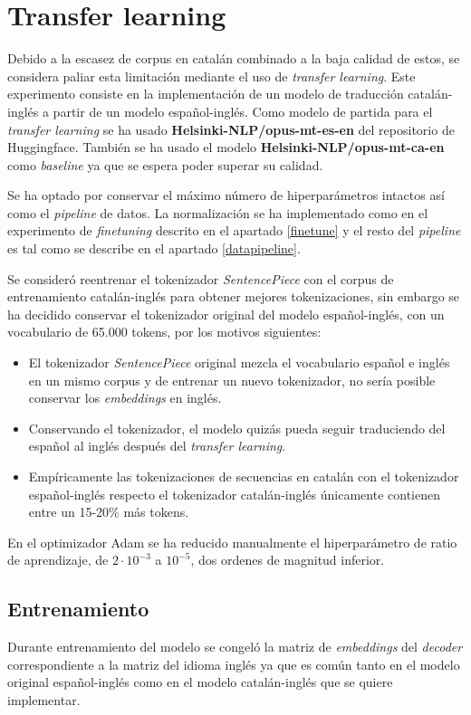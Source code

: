\section{Transfer learning}
Debido a la escasez de corpus en catalán combinado a la baja calidad de estos, se considera paliar esta limitación mediante el uso de \textit{transfer learning}.
Este experimento consiste en la implementación de un modelo de traducción catalán-inglés a partir de un modelo español-inglés.
Como modelo de partida para el \textit{transfer learning} se ha usado \textbf{Helsinki-NLP/opus-mt-es-en} del repositorio de Huggingface. También se ha usado el modelo \textbf{Helsinki-NLP/opus-mt-ca-en} como \textit{baseline} ya que se espera poder superar su calidad.

Se ha optado por conservar el máximo número de hiperparámetros intactos así como el \textit{pipeline} de datos. La normalización se ha implementado como en el experimento de \textit{finetuning} descrito en el apartado \ref{finetune} y el resto del \textit{pipeline} es tal como se describe en el apartado \ref{datapipeline}.

Se consideró reentrenar el tokenizador \textit{SentencePiece} con el corpus de entrenamiento catalán-inglés para obtener mejores tokenizaciones, sin embargo se ha decidido conservar el tokenizador original del modelo español-inglés, con un vocabulario de 65.000 tokens, por los motivos siguientes:
\begin{itemize}
    \item El tokenizador \textit{SentencePiece} original mezcla el vocabulario español e inglés en un mismo corpus y de entrenar un nuevo tokenizador, no sería posible conservar los \textit{embeddings} en inglés.
    \item Conservando el tokenizador, el modelo quizás pueda seguir traduciendo del español al inglés después del \textit{transfer learning}.
    \item Empíricamente las tokenizaciones de secuencias en catalán con el tokenizador español-inglés respecto el tokenizador catalán-inglés únicamente contienen entre un 15-20\% más tokens.
\end{itemize}

En el optimizador Adam \cite{Kingma2014Dec} se ha reducido manualmente el hiperparámetro de ratio de aprendizaje, de $2\cdot 10^{-3}$ a $10^{-5}$, dos ordenes de magnitud inferior.


\subsection{Entrenamiento}
Durante entrenamiento del modelo se congeló la matriz de \textit{embeddings} del \textit{decoder} correspondiente a la matriz del idioma inglés ya que es común tanto en el modelo original español-inglés como en el modelo catalán-inglés que se quiere implementar.

